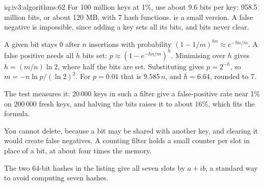 \begin{solution}{iq:iv3:algorithms:62}
For 100 million keys at 1\%, use about 9.6 bits per key: 958.5 million bits, or about 120 MB, with 7 hash functions.  is a small version. A false negative is impossible, since adding a key sets all its bits, and bits never clear.
\label{lst:iv3:al:bloom}

A given bit stays 0 after $n$ insertions with probability $(1 - 1/m)^{hn} \approx e^{-hn/m}$. A false positive needs all $h$ bits set: $p \approx (1 - e^{-hn/m})^h$. Minimising over $h$ gives $h = (m/n)\ln 2$, where half the bits are set. Substituting gives $p = 2^{-h}$, so $m = -n \ln p / (\ln 2)^2$. For $p = 0.01$ that is $9.585\,n$, and $h = 6.64$, rounded to 7.

The test measures it: 20\,000 keys in such a filter give a false-positive rate near 1\% on 200\,000 fresh keys, and halving the bits raises it to about 16\%, which fits the formula.

You cannot delete, because a bit may be shared with another key, and clearing it would create false negatives. A counting filter holds a small counter per slot in place of a bit, at about four times the memory.

The two 64-bit hashes in the listing give all seven slots by $a + ib$, a standard way to avoid computing seven hashes.

\end{solution}

